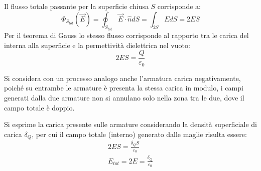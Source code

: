 \documentclass{article}
\numberwithin{equation}{subsection}
\begin{document}
Il flusso totale passante per la superficie chiusa $S$ corrisponde a:
\begin{equation*}
    \Phi_{S_{tot}}(\vec{E})=\displaystyle\oint_{S_{tot}}\vec{E}\cdot\hat{n}dS=\int_{2S}EdS=2ES
\end{equation*}
Per il teorema di Gauss lo stesso flusso corrisponde al rapporto tra le carica del interna alla superficie e la permettività dielettrica nel vuoto:
\begin{equation*}
    2ES=\displaystyle\frac{Q}{\varepsilon_0}
\end{equation*}

Si considera con un processo analogo anche l'armatura carica negativamente, poiché su entrambe le armature è presenta la stessa carica in modulo, i campi generati dalla due 
armature non si annulano solo nella zona tra le due, dove il campo totale è doppio. 
\begin{center}
\end{center}

Si esprime la carica presente sulle armature considerando la densità superficiale di carica $\delta_Q$, per cui il campo totale (interno) generato dalle maglie risulta essere:
\begin{gather*}
    2ES=\displaystyle\frac{\delta_QS}{\varepsilon_0}\\
    E_{tot}=2E=\displaystyle\frac{\delta_Q}{\varepsilon_0}
\end{gather*}
\end{document}
